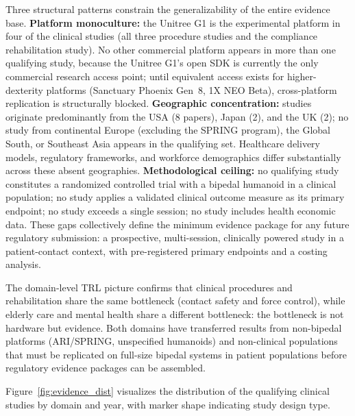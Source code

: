\documentclass[acmsmall]{acmart}
\begin{document}
Three structural patterns constrain the generalizability of the entire evidence
base. \textbf{Platform monoculture:} the Unitree G1 is the experimental platform
in four of the clinical studies (all three procedure studies and the compliance
rehabilitation study). No other commercial platform appears in more than one qualifying study,
because the Unitree G1's open SDK is currently the only commercial research
access point; until equivalent access exists for higher-dexterity platforms
(Sanctuary Phoenix Gen~8, 1X NEO Beta), cross-platform replication is
structurally blocked. \textbf{Geographic concentration:} studies originate
predominantly from the USA (8 papers), Japan (2), and the UK (2); no study from
continental Europe (excluding the SPRING program), the Global South, or Southeast
Asia appears in the qualifying set. Healthcare delivery models, regulatory
frameworks, and workforce demographics differ substantially across these absent
geographies. \textbf{Methodological ceiling:} no qualifying study constitutes a
randomized controlled trial with a bipedal humanoid in a clinical population; no
study applies a validated clinical outcome measure as its primary endpoint; no
study exceeds a single session; no study includes health economic data. These
gaps collectively define the minimum evidence package for any future regulatory
submission: a prospective, multi-session, clinically powered study in a
patient-contact context, with pre-registered primary endpoints and a costing
analysis.

The domain-level TRL picture confirms that clinical procedures and rehabilitation
share the same bottleneck (contact safety and force control), while elderly
care and mental health share a different bottleneck: the bottleneck is not
hardware but evidence. Both domains have transferred results from non-bipedal
platforms (ARI/SPRING, unspecified humanoids) and non-clinical populations that
must be replicated on full-size bipedal systems in patient populations before
regulatory evidence packages can be assembled.

Figure~\ref{fig:evidence_dist} visualizes the distribution of the qualifying
clinical studies by domain and year, with marker shape indicating study design type.
\end{document}
